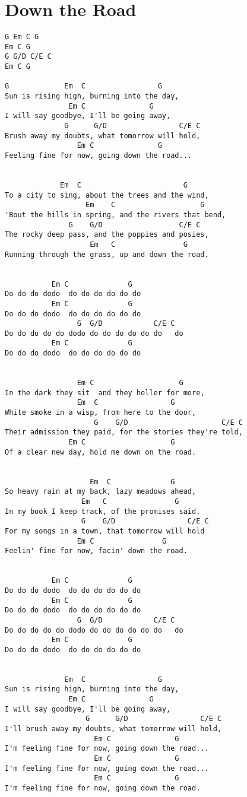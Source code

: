 \documentclass[leqno]{memoir}
\begin{document}
\chapter{Down the Road}
\begin{verbatim}
G Em C G  
Em C G
G G/D C/E C     
Em C G

G             Em  C                 G
Sun is rising high, burning into the day,
               Em C               G
I will say goodbye, I'll be going away,
              G      G/D                 C/E C
Brush away my doubts, what tomorrow will hold,
                 Em C               G
Feeling fine for now, going down the road...


             Em  C                        G
To a city to sing, about the trees and the wind,
                   Em    C                    G
'Bout the hills in spring, and the rivers that bend,
               G    G/D                  C/E C
The rocky deep pass, and the poppies and posies,
                    Em   C                G
Running through the grass, up and down the road.


           Em C              G
Do do do dodo  do do do do do do
           Em C              G
Do do do dodo  do do do do do do 
                 G  G/D            C/E C
Do do do do do dodo do do do do do do   do 
           Em C              G
Do do do dodo  do do do do do do 


                 Em C                    G
In the dark they sit  and they holler for more,
                 Em  C                 G
White smoke in a wisp, from here to the door,
                     G    G/D                      C/E C
Their admission they paid, for the stories they're told,
               Em C                    G
Of a clear new day, hold me down on the road.


                    Em  C              G
So heavy rain at my back, lazy meadows ahead,
                  Em   C                G
In my book I keep track, of the promises said.
                  G    G/D                 C/E C
For my songs in a town, that tomorrow will hold
                 Em C                G
Feelin' fine for now, facin' down the road.


           Em C              G
Do do do dodo  do do do do do do
           Em C              G
Do do do dodo  do do do do do do 
                 G  G/D            C/E C
Do do do do do dodo do do do do do do   do 
           Em C              G
Do do do dodo  do do do do do do 


              Em  C                 G
Sun is rising high, burning into the day,
               Em C               G
I will say goodbye, I'll be going away,
                   G      G/D                 C/E C
I'll brush away my doubts, what tomorrow will hold,
                     Em C               G
I'm feeling fine for now, going down the road...
                     Em C               G
I'm feeling fine for now, going down the road...
                     Em C               G
I'm feeling fine for now, going down the road.



\end{verbatim}
\end{document}
